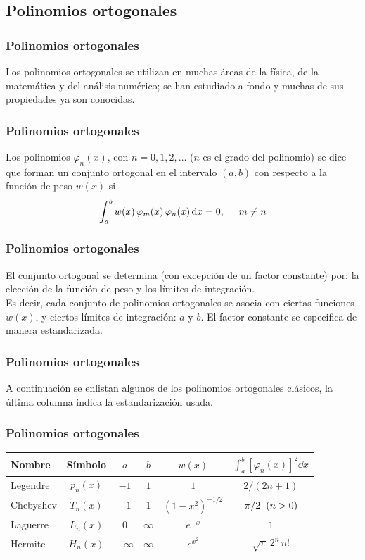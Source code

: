 \subsection{Polinomios ortogonales}
\begin{frame}
\frametitle{Polinomios ortogonales}
Los polinomios ortogonales se utilizan en muchas áreas de la física, de la matemática y del análisis numérico; se han estudiado a fondo y muchas de sus propiedades ya son conocidas. 
\end{frame}
\begin{frame}
\frametitle{Polinomios ortogonales}
Los polinomios $\varphi_{n}(x)$, con $n = 0, 1, 2,\ldots$ ($n$ es el grado del polinomio) se dice que forman un conjunto ortogonal en el intervalo $(a, b)$ con respecto a la función de peso $w(x)$ si
\begin{align*}
\int_{a}^{b} w(x) \, \varphi_{m}(x) \, \varphi_{n}(x) \dd{x} = 0, \hspace{0.5cm} m \neq n 
\end{align*}
\end{frame}
\begin{frame}
    \frametitle{Polinomios ortogonales}
El conjunto ortogonal se determina (con excepción de un factor constante) por: la elección de la función de peso y los límites de integración.
\\
\bigskip
Es decir, cada conjunto de polinomios ortogonales se asocia con ciertas funciones $w(x)$, y ciertos límites de integración: $a$ y $b$. El factor constante se especifica de manera estandarizada.
\end{frame}
\begin{frame}
\frametitle{Polinomios ortogonales}
A continuación se enlistan algunos de los polinomios ortogonales clásicos, la última columna indica la estandarización usada.
\end{frame}
\begin{frame}
\frametitle{Polinomios ortogonales}
\fontsize{12}{12}\selectfont
\begin{tabular}{| l | c | c | c | c | c |}
\hline
Nombre & Símbolo & $a$ & $b$ & $w(x)$ & $\int_{a}^{b} \left[ \varphi_{n} (x)\right]^{2} \dd{x} $ \\ \hline
Legendre & $p_{n}(x)$ & $-1$ & $1$ & $1$ & $2/(2n+1)$ \\
Chebyshev & $T_{n}(x)$ & $-1$ & $1$ & $(1 - x^{2})^{-1/2}$ & $\pi/2 \hspace{0.2cm} (n>0)$ \\
Laguerre & $L_{n}(x)$ & $0$ & $\infty$ & $e^{-x}$ & $1$ \\
Hermite & $H_{n}(x)$ & $-\infty$ & $\infty$ & $e^{x^{2}}$ & $\sqrt{\pi} \, 2^{n} \, n!$ \\ \hline
\end{tabular}
\end{frame}
